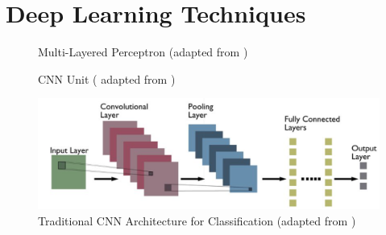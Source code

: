 \section{Deep Learning Techniques}
\begin{frame}
    \begin{figure}[t]
        \centering
        \resizebox{.6\linewidth}{!}{}
        \caption{Multi-Layered Perceptron (adapted from \textcite{neutelings2021_nn})}
        \label{fig:MLP}
    \end{figure}
\end{frame}

\begin{frame}
    \begin{figure}[t]
        \centering 
        \resizebox{.6\linewidth}{!}{}
        \caption{CNN Unit ( adapted from \textcite{neutelings2022_conv})}
        \label{fig:convolution}
        \includegraphics[width=.8\linewidth]{figures/Typical-CNN-architecture.png}
        \caption{Traditional CNN Architecture for Classification (adapted from \cite{kumar2022_cnn})}
        \label{fig:CNN}
    \end{figure}
\end{frame}

